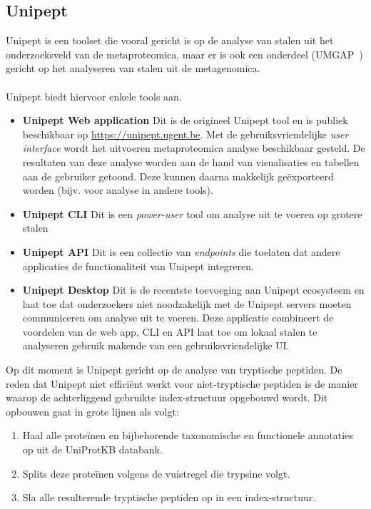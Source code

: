 \documentclass[11pt,dutch,faculty=we,layout=titlefont,underline=false,titleUppercase=true,titleUnderline=true]{ugent2016-report}
\begin{document}
    \subsection{Unipept}\label{subsec:unipept-introductie}
    Unipept is een toolset die vooral gericht is op de analyse van stalen uit het onderzoeksveld van de metaproteomica, maar er is ook een onderdeel (UMGAP~\cite{UMGAP_paper}) gericht op het analyseren van stalen uit de metagenomica.
    \\ \\
    Unipept biedt hiervoor enkele tools aan.
    \begin{itemize}
        \item \textbf{Unipept Web application} Dit is de origineel Unipept tool en is publiek beschikbaar op \url{https://unipept.ugent.be}.
        Met de gebruiksvriendelijke \textit{user interface} wordt het uitvoeren metaproteomica analyse beschikbaar gesteld.
        De resultaten van deze analyse worden aan de hand van visualisaties en tabellen aan de gebruiker getoond.
        Deze kunnen daarna makkelijk geëxporteerd worden (bijv. voor analyse in andere tools).
        \item \textbf{Unipept CLI} Dit is een \textit{power-user} tool om analyse uit te voeren op grotere stalen
        \item \textbf{Unipept API} Dit is een collectie van \textit{endpoints} die toelaten dat andere applicaties de functionaliteit van Unipept integreren.
        \item \textbf{Unipept Desktop} Dit is de recentste toevoeging aan Unipept ecosysteem en laat toe dat onderzoekers niet noodzakelijk met de Unipept servers moeten communiceren om analyse uit te voeren.
        Deze applicatie combineert de voordelen van de web app, CLI en API laat toe om lokaal stalen te analyseren gebruik makende van een gebruiksvriendelijke UI\@.

    \end{itemize}

    Op dit moment is Unipept gericht op de analyse van tryptische peptiden.
    De reden dat Unipept niet efficiënt werkt voor niet-tryptische peptiden is de manier waarop de achterliggend gebruikte index-structuur opgebouwd wordt.
    Dit opbouwen gaat in grote lijnen als volgt:

    \begin{enumerate}
        \item Haal alle proteïnen en bijbehorende taxonomische en functionele annotaties op uit de UniProtKB databank.
        \item Splits deze proteïnen volgens de vuistregel die trypsine volgt.
        \item Sla alle resulterende tryptische peptiden op in een index-structuur.
    \end{enumerate}
\end{document}
